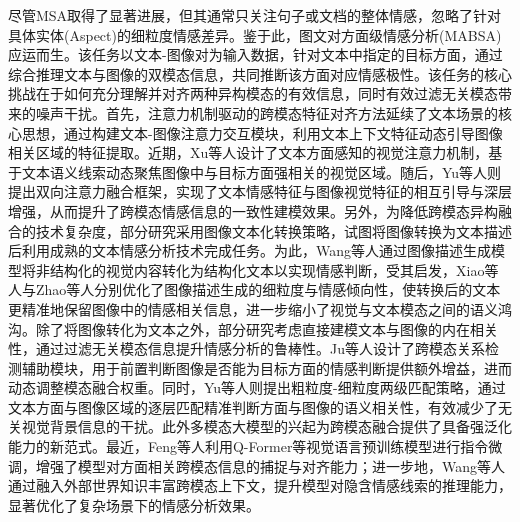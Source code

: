 尽管MSA取得了显著进展，但其通常只关注句子或文档的整体情感，忽略了针对具体实体(Aspect)的细粒度情感差异。鉴于此，图文对方面级情感分析(MABSA)应运而生。该任务以文本-图像对为输入数据，针对文本中指定的目标方面，通过综合推理文本与图像的双模态信息，共同推断该方面对应情感极性。该任务的核心挑战在于如何充分理解并对齐两种异构模态的有效信息，同时有效过滤无关模态带来的噪声干扰。首先，注意力机制驱动的跨模态特征对齐方法延续了文本场景的核心思想，通过构建文本-图像注意力交互模块，利用文本上下文特征动态引导图像相关区域的特征提取。近期，Xu等人设计了文本方面感知的视觉注意力机制，基于文本语义线索动态聚焦图像中与目标方面强相关的视觉区域\cite{xu2019multi}。随后，Yu等人则提出双向注意力融合框架，实现了文本情感特征与图像视觉特征的相互引导与深层增强\cite{yu2019adapting,yu2019entity}，从而提升了跨模态情感信息的一致性建模效果。另外，为降低跨模态异构融合的技术复杂度，部分研究采用图像文本化转换策略，试图将图像转换为文本描述后利用成熟的文本情感分析技术完成任务。为此，Wang等人通过图像描述生成模型将非结构化的视觉内容转化为结构化文本以实现情感判断\cite{wang2023dual}，受其启发，Xiao等人与Zhao等人分别优化了图像描述生成的细粒度与情感倾向性，使转换后的文本更精准地保留图像中的情感相关信息\cite{xiao2023cross,zhao2022learning}，进一步缩小了视觉与文本模态之间的语义鸿沟。除了将图像转化为文本之外，部分研究考虑直接建模文本与图像的内在相关性，通过过滤无关模态信息提升情感分析的鲁棒性。Ju等人设计了跨模态关系检测辅助模块，用于前置判断图像是否能为目标方面的情感判断提供额外增益，进而动态调整模态融合权重\cite{ju2021joint}。同时，Yu等人则提出粗粒度-细粒度两级匹配策略，通过文本方面与图像区域的逐层匹配精准判断方面与图像的语义相关性\cite{yu2022targeted}，有效减少了无关视觉背景信息的干扰。此外多模态大模型的兴起为跨模态融合提供了具备强泛化能力的新范式。最近，Feng等人利用Q-Former等视觉语言预训练模型进行指令微调，增强了模型对方面相关跨模态信息的捕捉与对齐能力\cite{feng2024autonomous}；进一步地，Wang等人通过融入外部世界知识丰富跨模态上下文，提升模型对隐含情感线索的推理能力，显著优化了复杂场景下的情感分析效果\cite{wang2024wisdom}。


